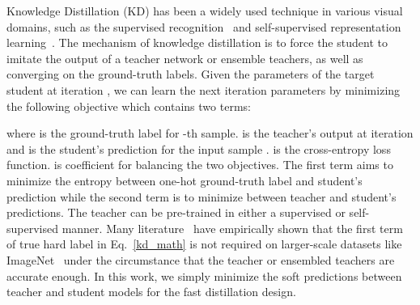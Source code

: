 \documentclass[10pt,twocolumn,letterpaper]{article}
\begin{document}
Knowledge Distillation (KD)\cite{hinton2015distilling} has been a widely used technique in various visual domains, such as the supervised recognition~\cite{romero2014fitnets,yim2017gift,xie2020self,muller2019does,shen2021label,beyer2021knowledge} and self-supervised representation learning~\cite{shen2021s2,fang2021seed,caron2021emerging}. The mechanism of knowledge distillation is to force the student to imitate the output of a teacher network or ensemble teachers, as well as converging on the ground-truth labels. Given the parameters  of the target student at iteration , we can learn the next iteration parameters  by minimizing the following objective which contains two terms:
\vspace{-0.1in}

where  is the ground-truth label for -th sample.  is the teacher's output at iteration  and  is the student's prediction for the input sample .  is the cross-entropy loss function.  is coefficient for balancing the two objectives. The first term aims to minimize the entropy between one-hot ground-truth label and student's prediction while the second term is to minimize between teacher and student's predictions. The teacher  can be pre-trained in either a supervised or self-supervised manner. Many literature~\cite{shen2020meal,yun2021re,beyer2021knowledge,shen2021label} have empirically shown that the first term of true hard label in Eq.~\ref{kd_math} is not required on larger-scale datasets like ImageNet~\cite{deng2009imagenet} under the circumstance that the teacher or ensembled teachers are accurate enough. In this work, we simply minimize the soft predictions between teacher and student models for the fast distillation design.

\begin{table}[t]
\centering
\caption{A feature-by-feature comparison between ReLabel~\cite{yun2021re} and our FKD framework on various elements and properties.}
\label{tab:my-table_dataset}
\vspace{-0.1in}
\vspace{-0.1in}
\end{table}
\end{document}
